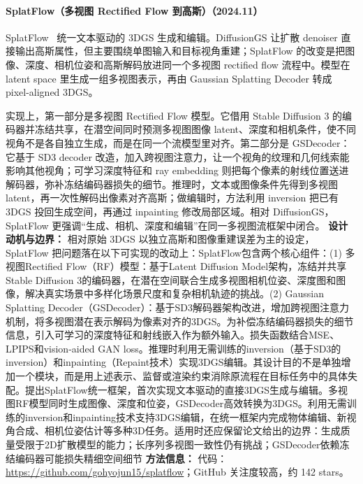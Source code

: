 \paragraph{SplatFlow（多视图 Rectified Flow 到高斯）（2024.11）}
SplatFlow~\cite{2411_16443} 统一文本驱动的 3DGS 生成和编辑。DiffusionGS 让扩散 denoiser 直接输出高斯属性，但主要围绕单图输入和目标视角重建；SplatFlow 的改变是把图像、深度、相机位姿和高斯解码放进同一个多视图 rectified flow 流程中。模型在 latent space 里生成一组多视图表示，再由 Gaussian Splatting Decoder 转成 pixel-aligned 3DGS。

实现上，第一部分是多视图 Rectified Flow 模型。它借用 Stable Diffusion 3 的编码器并冻结共享，在潜空间同时预测多视图图像 latent、深度和相机条件，使不同视角不是各自独立生成，而是在同一个流模型里对齐。第二部分是 GSDecoder：它基于 SD3 decoder 改造，加入跨视图注意力，让一个视角的纹理和几何线索能影响其他视角；可学习深度特征和 ray embedding 则把每个像素的射线位置送进解码器，弥补冻结编码器损失的细节。推理时，文本或图像条件先得到多视图 latent，再一次性解码出像素对齐高斯；做编辑时，方法利用 inversion 把已有 3DGS 投回生成空间，再通过 inpainting 修改局部区域。相对 DiffusionGS，SplatFlow 更强调“生成、相机、深度和编辑”在同一多视图流框架中闭合。
\textbf{设计动机与边界：} 相对原始 3DGS 以独立高斯和图像重建误差为主的设定，SplatFlow 把问题落在以下可实现的改动上：SplatFlow包含两个核心组件：(1) 多视图Rectified Flow（RF）模型：基于Latent Diffusion Model架构，冻结并共享Stable Diffusion 3的编码器，在潜在空间联合生成多视图相机位姿、深度图和图像，解决真实场景中多样化场景尺度和复杂相机轨迹的挑战。(2) Gaussian Splatting Decoder（GSDecoder）：基于SD3解码器架构改进，增加跨视图注意力机制，将多视图潜在表示解码为像素对齐的3DGS。为补偿冻结编码器损失的细节信息，引入可学习的深度特征和射线嵌入作为额外输入。损失函数结合MSE、LPIPS和vision-aided GAN loss。推理时利用无需训练的inversion（基于SD3的inversion）和inpainting（Repaint技术）实现3DGS编辑。其设计目的不是单独增加一个模块，而是用上述表示、监督或渲染约束消除原流程在目标任务中的具体失配。提出SplatFlow统一框架，首次实现文本驱动的直接3DGS生成与编辑。多视图RF模型同时生成图像、深度和位姿，GSDecoder高效转换为3DGS。利用无需训练的inversion和inpainting技术支持3DGS编辑，在统一框架内完成物体编辑、新视角合成、相机位姿估计等多种3D任务。适用时还应保留论文给出的边界：生成质量受限于2D扩散模型的能力；长序列多视图一致性仍有挑战；GSDecoder依赖冻结编码器可能损失精细空间细节
\textbf{方法信息：} 代码：\url{https://github.com/gohyojun15/splatflow}；GitHub 关注度较高，约 142 stars。



